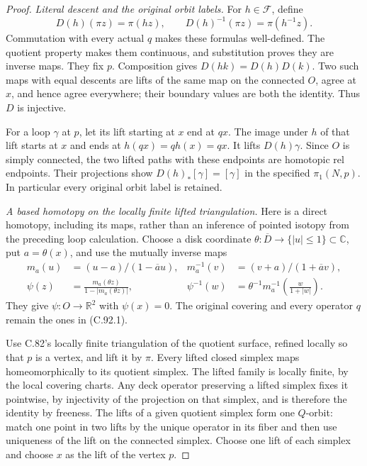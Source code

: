 \begin{proof}
\emph{Literal descent and the original orbit labels.}
For $h\in\mathscr F$, define
\[
 D(h)(\pi z)=\pi(hz),\qquad
 D(h)^{-1}(\pi z)=\pi(h^{-1}z).
                                                               \tag{C.92.1}
\]
Commutation with every actual $q$ makes these formulas well-defined.
The quotient property makes them continuous, and substitution proves
they are inverse maps. They fix $p$. Composition gives
$D(hk)=D(h)D(k)$. Two such maps with equal descents are lifts of the
same map on the connected $O$, agree at $x$, and hence agree everywhere;
their boundary values are both the identity. Thus $D$ is injective.

For a loop $\gamma$ at $p$, let its lift starting at $x$ end at $qx$.
The image under $h$ of that lift starts at $x$ and ends at
$h(qx)=qh(x)=qx$. It lifts $D(h)\gamma$.
Since $O$ is simply connected, the two lifted paths with these
endpoints are homotopic rel endpoints. Their projections show
$D(h)_*[\gamma]=[\gamma]$ in the specified $\pi_1(N,p)$.
In particular every original orbit label is retained.

\emph{A based homotopy on the locally finite lifted triangulation.}
Here is a direct homotopy, including its maps, rather than an
inference of pointed isotopy from the preceding loop calculation.
Choose a disk coordinate $\theta:\overline D\to\{|u|\leq1\}\subset
\mathbb C$, put $a=\theta(x)$, and use the mutually inverse maps
\[
 \begin{aligned}
 m_a(u)&=(u-a)/(1-\overline a u),
 &m_a^{-1}(v)&=(v+a)/(1+\overline a v),\\
 \psi(z)&=\frac{m_a(\theta z)}{1-|m_a(\theta z)|},
 &\psi^{-1}(w)&=\theta^{-1}m_a^{-1}\left(\frac{w}{1+|w|}\right).
 \end{aligned}                                                  \tag{C.92.2}
\]
They give $\psi:O\to\mathbb R^2$ with $\psi(x)=0$.
The original covering and every operator $q$ remain the ones in
(C.92.1).

Use C.82's locally finite triangulation of the quotient surface,
refined locally so that $p$ is a vertex, and lift it by $\pi$.
Every lifted closed simplex maps homeomorphically to its quotient
simplex. The lifted family is locally finite, by the local covering
charts. Any deck operator preserving a lifted simplex fixes it
pointwise, by injectivity of the projection on that simplex, and is
therefore the identity by freeness. The lifts of a given quotient
simplex form one $Q$-orbit: match one point in two lifts by the unique
operator in its fiber and then use uniqueness of the lift on the
connected simplex. Choose one lift of each simplex and choose $x$
as the lift of the vertex $p$.


\end{proof}
